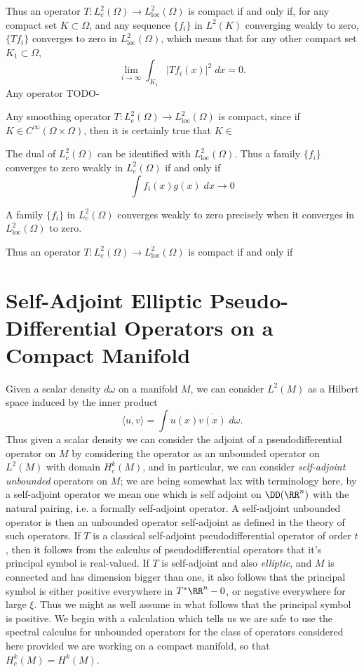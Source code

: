 Thus an operator $T: L^2_c(\Omega) \to L^2_{\text{loc}}(\Omega)$ is compact if and only if, for any compact set $K \subset \Omega$, and any sequence $\{ f_i \}$ in $L^2(K)$ converging weakly to zero, $\{ Tf_i \}$ converges to zero in $L^2_{\text{loc}}(\Omega)$, which means that for any other compact set $K_1 \subset \Omega$,
%
\[ \lim_{i \to \infty} \int_{K_1} |Tf_i(x)|^2\; dx = 0. \]
%
Any operator TODO-

Any smoothing operator $T: L^2_c(\Omega) \to L^2_{\text{loc}}(\Omega)$ is compact, since if $K \in C^\infty(\Omega \times \Omega)$, then it is certainly true that $K \in $

The dual of $L^2_c(\Omega)$ can be identified with $L^2_{\text{loc}}(\Omega)$. Thus a family $\{ f_i \}$ converges to zero weakly in $L^2_c(\Omega)$ if and only if
%
\[ \int f_i(x) g(x)\; dx \to 0 \]

A family $\{ f_i \}$ in $L^2_c(\Omega)$ converges weakly to zero precisely when it converges in $L^2_{\text{loc}}(\Omega)$ to zero.

Thus an operator $T: L^2_c(\Omega) \to L^2_{\text{loc}}(\Omega)$ is compact if and only if 







\section{Self-Adjoint Elliptic Pseudo-Differential Operators on a Compact Manifold}

Given a scalar density $d\omega$ on a manifold $M$, we can consider $L^2(M)$ as a Hilbert space induced by the inner product
%
\[ \langle u, v \rangle = \int u(x) \overline{v(x)}\; d\omega. \]
%
Thus given a scalar density we can consider the adjoint of a pseudodifferential operator on $M$ by considering the operator as an unbounded operator on $L^2(M)$ with domain $H^k_c(M)$, and in particular, we can consider \emph{self-adjoint unbounded} operators on $M$; we are being somewhat lax with terminology here, by a self-adjoint operator we mean one which is self adjoint on $\DD(\RR^n)$ with the natural pairing, i.e. a formally self-adjoint operator. A self-adjoint unbounded operator is then an unbounded operator self-adjoint as defined in the theory of such operators. If $T$ is a classical self-adjoint pseudodifferential operator of order $t$, then it follows from the calculus of pseudodifferential operators that it's principal symbol is real-valued. If $T$ is self-adjoint and also \emph{elliptic}, and $M$ is connected and has dimension bigger than one, it also follows that the principal symbol is either positive everywhere in $T^* \RR^n - 0$, or negative everywhere for large $\xi$. Thus we might as well assume in what follows that the principal symbol is positive. We begin with a calculation which tells us we are safe to use the spectral calculus for unbounded operators for the class of operators considered here provided we are working on a compact manifold, so that $H^k_c(M) = H^k(M)$.

